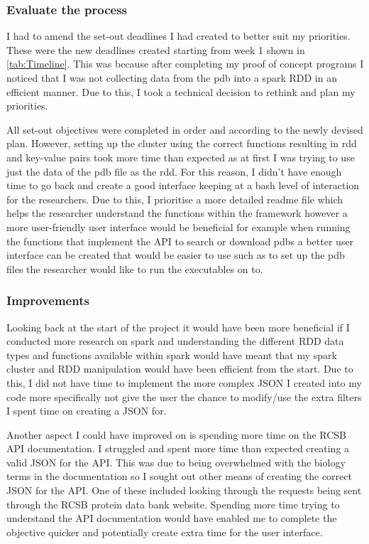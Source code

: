 \documentclass[]{final_report}
\begin{document}
\subsubsection{Evaluate the process}

I had to amend the set-out deadlines I had created to better suit my priorities. These were the new deadlines created starting from week 1 shown in \ref{tab:Timeline}. This was because after completing my proof of concept programs I noticed that I was not collecting data from the pdb into a spark RDD in an efficient manner. Due to this, I took a technical decision to rethink and plan my priorities.

All set-out objectives were completed in order and according to the newly devised plan. However, setting up the cluster using the correct functions resulting in rdd and key-value pairs took more time than expected as at first I was trying to use just the data of the pdb file as the rdd. For this reason, I didn't have enough time to go back and create a good interface keeping at a bash level of interaction for the researchers. Due to this, I prioritise a more detailed readme file which helps the researcher understand the functions within the framework however a more user-friendly user interface would be beneficial for example when running the functions that implement the API to search or download pdbs a better user interface can be created that would be easier to use such as to set up the pdb files the researcher would like to run the executables on to.

\clearpage

\subsubsection{Improvements}
Looking back at the start of the project it would have been more beneficial if I conducted more research on spark and understanding the different RDD data types and functions available within spark would have meant that my spark cluster and RDD manipulation would have been efficient from the start. Due to this, I did not have time to implement the more complex JSON I created into my code more specifically not give the user the chance to modify/use the extra filters I spent time on creating a JSON for.

Another aspect I could have improved on is spending more time on the RCSB API documentation. I struggled and spent more time than expected creating a valid JSON for the API. This was due to being overwhelmed with the biology terms in the documentation so I sought out other means of creating the correct JSON for the API. One of these included looking through the requests being sent through the RCSB protein data bank website. Spending more time trying to understand the API documentation would have enabled me to complete the objective quicker and potentially create extra time for the user interface.
\end{document}
